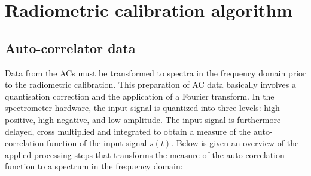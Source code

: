 %
%
%
%
%
%




\section{Radiometric calibration algorithm}

\subsection{Auto-correlator data}

Data from the ACs must be transformed to spectra in the frequency domain
prior to the radiometric calibration.
This preparation of AC data basically involves a quantisation correction and the application
of a Fourier transform.
In the spectrometer hardware, the input signal is quantized into three levels: 
high positive, high negative, and low amplitude. The input signal is furthermore delayed, 
cross multiplied and integrated to obtain a measure of the auto-correlation function of the 
input signal \(s(t)\). Below is given an overview of the applied processing steps that 
transforms the measure of the auto-correlation function to a spectrum in the frequency 
domain:

